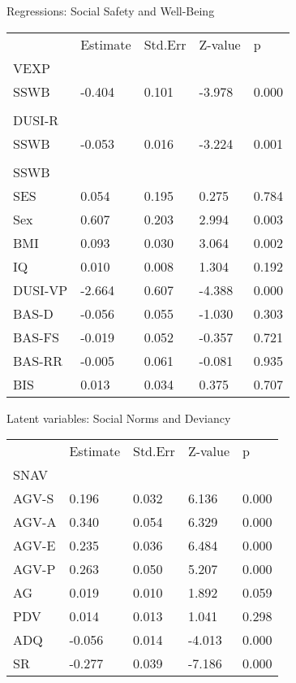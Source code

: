 \documentclass[utf8]{frontiersSCNS} %
\begin{document}
Regressions: Social Safety and Well-Being
\begin{table}[]
\begin{tabular}{lllll}
        & Estimate & Std.Err & Z-value & p     \\
VEXP    &          &         &         &       \\
SSWB    & -0.404   & 0.101   & -3.978  & 0.000 \\
        &          &         &         &       \\
DUSI-R  &          &         &         &       \\
SSWB    & -0.053   & 0.016   & -3.224  & 0.001 \\
        &          &         &         &       \\
SSWB    &          &         &         &       \\
SES     & 0.054    & 0.195   & 0.275   & 0.784 \\
Sex     & 0.607    & 0.203   & 2.994   & 0.003 \\
BMI     & 0.093    & 0.030   & 3.064   & 0.002 \\
IQ      & 0.010    & 0.008   & 1.304   & 0.192 \\
DUSI-VP & -2.664   & 0.607   & -4.388  & 0.000 \\
BAS-D   & -0.056   & 0.055   & -1.030  & 0.303 \\
BAS-FS  & -0.019   & 0.052   & -0.357  & 0.721 \\
BAS-RR  & -0.005   & 0.061   & -0.081  & 0.935 \\
BIS     & 0.013    & 0.034   & 0.375   & 0.707
\end{tabular}
\end{table}

Latent variables: Social Norms and Deviancy
\begin{table}[]
\begin{tabular}{lllll}
      & Estimate & Std.Err & Z-value & p     \\
SNAV  &          &         &         &       \\
AGV-S & 0.196    & 0.032   & 6.136   & 0.000 \\
AGV-A & 0.340    & 0.054   & 6.329   & 0.000 \\
AGV-E & 0.235    & 0.036   & 6.484   & 0.000 \\
AGV-P & 0.263    & 0.050   & 5.207   & 0.000 \\
AG    & 0.019    & 0.010   & 1.892   & 0.059 \\
PDV   & 0.014    & 0.013   & 1.041   & 0.298 \\
ADQ   & -0.056   & 0.014   & -4.013  & 0.000 \\
SR    & -0.277   & 0.039   & -7.186  & 0.000
\end{tabular}
\end{table}
\end{document}
